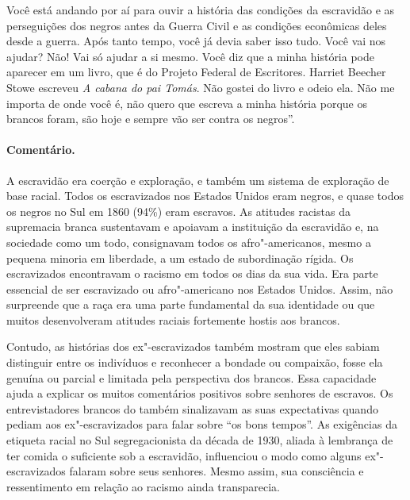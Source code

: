 Você está andando por aí para ouvir a história das condições da
escravidão e as perseguições dos negros antes da Guerra Civil e as
condições econômicas deles desde a guerra. Após tanto tempo, você já
devia saber isso tudo. Você vai nos ajudar? Não! Vai só ajudar a si
mesmo. Você diz que a minha história pode aparecer em um livro, que é do
Projeto Federal de Escritores. Harriet Beecher Stowe escreveu \emph{A
cabana do pai Tomás}. Não gostei do livro e odeio ela. Não me importa de
onde você é, não quero que escreva a minha história porque os brancos
foram, são hoje e sempre vão ser contra os negros''.

\paragraph{Comentário.}\quad
{\small
A escravidão era coerção e exploração, e também um sistema de
exploração de base racial. Todos os escravizados nos Estados Unidos eram
negros, e quase todos os negros no Sul em 1860 (94\%) eram escravos. As
atitudes racistas da supremacia branca sustentavam e apoiavam a
instituição da escravidão e, na sociedade como um todo, consignavam
todos os afro"-americanos, mesmo a pequena minoria em liberdade, a um
estado de subordinação rígida. Os escravizados encontravam o racismo em
todos os dias da sua vida. Era parte essencial de ser escravizado ou
afro"-americano nos Estados Unidos. Assim, não surpreende que a raça era
uma parte fundamental da sua identidade ou que muitos desenvolveram
atitudes raciais fortemente hostis aos brancos.

Contudo, as histórias dos ex"-escravizados também mostram que eles
sabiam distinguir entre os indivíduos e reconhecer a bondade ou
compaixão, fosse ela genuína ou parcial e limitada pela perspectiva dos
brancos. Essa capacidade ajuda a explicar os muitos comentários
positivos sobre senhores de escravos. Os entrevistadores brancos do 
também sinalizavam as suas expectativas quando pediam aos ex"-escravizados
para falar sobre ``os bons tempos''. As exigências da etiqueta racial no
Sul segregacionista da década de 1930, aliada à lembrança de ter comida
o suficiente sob a escravidão, influenciou o modo como alguns
ex"-escravizados falaram sobre seus senhores. Mesmo assim, sua consciência e
ressentimento em relação ao racismo ainda transparecia.
}

